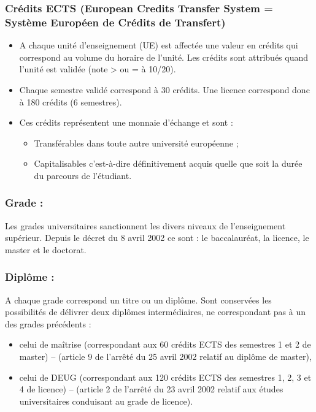 \documentclass[10pt, a5paper]{report}
\begin{document}
\begin{spacing}{1.5}
\subsubsection*{Crédits ECTS (European Credits Transfer System = Système Européen de Crédits de Transfert)}

\begin{itemize}
\item A chaque unité d’enseignement (UE) est affectée une valeur en crédits qui correspond au volume du horaire de l’unité. Les crédits sont attribués quand l’unité est validée (note > ou = à 10/20).
\item Chaque semestre validé correspond à 30 crédits. Une licence correspond donc à 180 crédits (6 semestres).
\item Ces crédits représentent une monnaie d’échange et sont : 
\begin{itemize}
\item Transférables dans toute autre université européenne ;
\item Capitalisables c’est-à-dire définitivement acquis quelle que soit la durée du parcours de l’étudiant. 
\end{itemize}
\end{itemize}

\subsubsection*{Grade :}

Les grades universitaires sanctionnent les divers niveaux de l’enseignement supérieur. Depuis le décret du 8 avril 2002 ce sont : le baccalauréat, la licence, le master et le doctorat.

\subsubsection*{Diplôme :}

A chaque grade correspond un titre ou un diplôme. Sont conservées les possibilités de délivrer deux diplômes intermédiaires, ne correspondant pas à un des grades précédents :
\begin{itemize}
\item celui de maîtrise (correspondant aux 60 crédits ECTS des semestres 1 et 2 de master) – (article 9 de l’arrêté du 25 avril 2002 relatif au diplôme de master),
\item celui de DEUG (correspondant aux 120 crédits ECTS des semestres 1, 2, 3 et 4 de licence) – (article 2 de l’arrêté du 23 avril 2002 relatif aux études universitaires conduisant au grade de licence).
\end{itemize}


\end{spacing}
\end{document}
